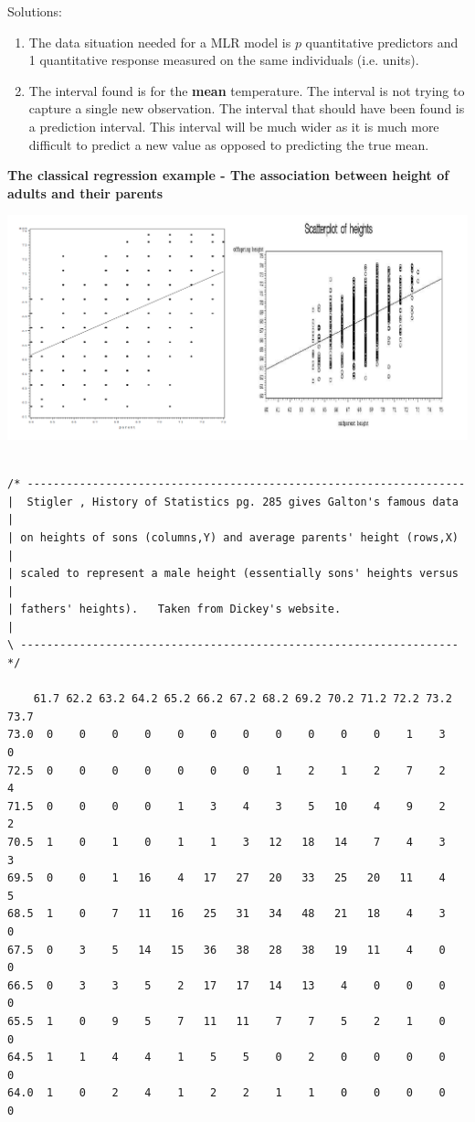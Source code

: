 Solutions:
\begin{enumerate}
\item The data situation needed for a MLR model is $p$ quantitative predictors and 1 quantitative response measured on the same individuals (i.e. units).
\item The interval found is for the \textbf{mean} temperature.  The interval is not trying to capture a single new observation.  The interval that should have been found is a prediction interval.  This interval will be much wider as it is much more difficult to predict a new value as opposed to predicting the true mean.
\end{enumerate}

\newpage

\textbf{The classical regression example - The association between height of adults and their parents}
\begin{center}
\includegraphics[scale=0.4]{galton}
\begin{small}
\begin{verbatim}

/* -------------------------------------------------------------------
|  Stigler , History of Statistics pg. 285 gives Galton's famous data |
| on heights of sons (columns,Y) and average parents' height (rows,X) |
| scaled to represent a male height (essentially sons' heights versus |
| fathers' heights).   Taken from Dickey's website.                   |
\ -------------------------------------------------------------------*/

    61.7 62.2 63.2 64.2 65.2 66.2 67.2 68.2 69.2 70.2 71.2 72.2 73.2 73.7
73.0  0    0    0    0    0    0    0    0    0    0    0    1    3    0
72.5  0    0    0    0    0    0    0    1    2    1    2    7    2    4
71.5  0    0    0    0    1    3    4    3    5   10    4    9    2    2
70.5  1    0    1    0    1    1    3   12   18   14    7    4    3    3
69.5  0    0    1   16    4   17   27   20   33   25   20   11    4    5
68.5  1    0    7   11   16   25   31   34   48   21   18    4    3    0
67.5  0    3    5   14   15   36   38   28   38   19   11    4    0    0
66.5  0    3    3    5    2   17   17   14   13    4    0    0    0    0
65.5  1    0    9    5    7   11   11    7    7    5    2    1    0    0
64.5  1    1    4    4    1    5    5    0    2    0    0    0    0    0
64.0  1    0    2    4    1    2    2    1    1    0    0    0    0    0
\end{verbatim}
\end{small}
\end{center}

